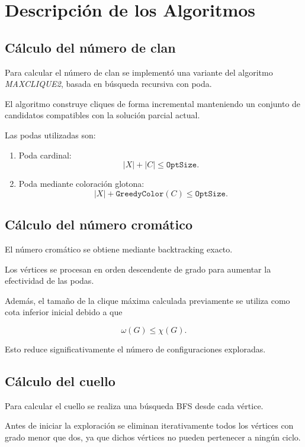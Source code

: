 \documentclass[12pt]{article}
\begin{document}
\section{Descripción de los Algoritmos}

\subsection{Cálculo del número de clan}

Para calcular el número de clan se implementó una variante del algoritmo
\emph{MAXCLIQUE2}, basada en búsqueda recursiva con poda.

El algoritmo construye cliques de forma incremental manteniendo un conjunto de
candidatos compatibles con la solución parcial actual.

Las podas utilizadas son:

\begin{enumerate}
    \item Poda cardinal:
    \[
    |X|+|C|\leq \texttt{OptSize}.
    \]

    \item Poda mediante coloración glotona:
    \[
    |X|+\texttt{GreedyColor}(C)\leq \texttt{OptSize}.
    \]
\end{enumerate}

\subsection{Cálculo del número cromático}

El número cromático se obtiene mediante backtracking exacto.

Los vértices se procesan en orden descendente de grado para aumentar la efectividad
de las podas.

Además, el tamaño de la clique máxima calculada previamente se utiliza como cota
inferior inicial debido a que

\[
\omega(G)\leq\chi(G).
\]

Esto reduce significativamente el número de configuraciones exploradas.

\subsection{Cálculo del cuello}

Para calcular el cuello se realiza una búsqueda BFS desde cada vértice.

Antes de iniciar la exploración se eliminan iterativamente todos los vértices con
grado menor que dos, ya que dichos vértices no pueden pertenecer a ningún ciclo.
\end{document}
